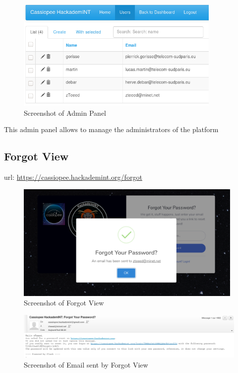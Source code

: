 \begin{figure}[!h]
  \centering
  \includegraphics[width=0.88\textwidth]{images/flask-application-0.png}
  \caption{Screenshot of Admin Panel}
  \label{AdminPanel}
\end{figure}

This admin panel allows to manage the administrators of the platform

\pagebreak

\subsection{Forgot View}
url: \url{https://cassiopee.hackademint.org/forgot}

\begin{figure}[!h]
  \centering
  \includegraphics[width=0.98\textwidth]{images/flask-application-02.png}
  \caption{Screenshot of Forgot View}
  \label{ForgotView}
\end{figure}


\begin{figure}[!h]
  \centering
  \includegraphics[width=1.05\textwidth]{images/flask-application-021.png}
  \caption{Screenshot of Email sent by Forgot View}
  \label{ForgotViewSent}
\end{figure}


